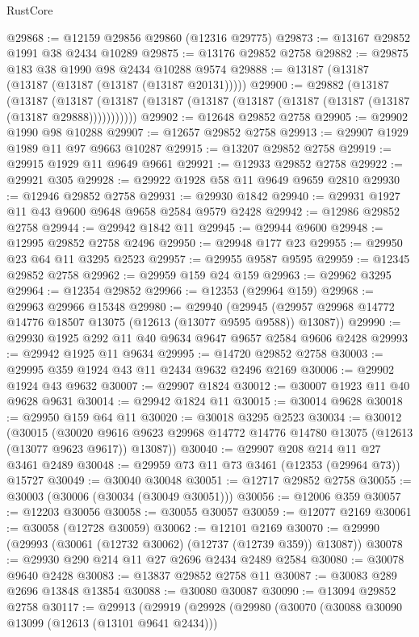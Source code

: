 \begin{lexlean}{RustCore}
\begin{coremodule}
@29868 := @12159 @29856 @29860 (@12316 @29775)
@29873 := @13167 @29852 @1991 @38 @2434 @10289
@29875 := @13176 @29852 @2758
@29882 := @29875 @183 @38 @1990 @98 @2434 @10288 @9574
@29888 := @13187 (@13187 (@13187 (@13187 (@13187 (@13187 @20131)))))
@29900 := @29882
    (@13187
      (@13187
        (@13187 (@13187 (@13187 (@13187 (@13187 (@13187 (@13187 (@13187 (@13187 @29888)))))))))))
@29902 := @12648 @29852 @2758
@29905 := @29902 @1990 @98 @10288
@29907 := @12657 @29852 @2758
@29913 := @29907 @1929 @1989 @11 @97 @9663 @10287
@29915 := @13207 @29852 @2758
@29919 := @29915 @1929 @11 @9649 @9661
@29921 := @12933 @29852 @2758
@29922 := @29921 @305
@29928 := @29922 @1928 @58 @11 @9649 @9659 @2810
@29930 := @12946 @29852 @2758
@29931 := @29930 @1842
@29940 := @29931 @1927 @11 @43 @9600 @9648 @9658 @2584 @9579 @2428
@29942 := @12986 @29852 @2758
@29944 := @29942 @1842 @11
@29945 := @29944 @9600
@29948 := @12995 @29852 @2758 @2496
@29950 := @29948 @177 @23
@29955 := @29950 @23 @64 @11 @3295 @2523
@29957 := @29955 @9587 @9595
@29959 := @12345 @29852 @2758
@29962 := @29959 @159 @24 @159
@29963 := @29962 @3295
@29964 := @12354 @29852
@29966 := @12353 (@29964 @159)
@29968 := @29963 @29966 @15348
@29980 := @29940
    (@29945 (@29957 @29968 @14772 @14776 @18507 @13075 (@12613 (@13077 @9595 @9588)) @13087))
@29990 := @29930 @1925 @292 @11 @40 @9634 @9647 @9657 @2584 @9606 @2428
@29993 := @29942 @1925 @11 @9634
@29995 := @14720 @29852 @2758
@30003 := @29995 @359 @1924 @43 @11 @2434 @9632 @2496 @2169
@30006 := @29902 @1924 @43 @9632
@30007 := @29907 @1824
@30012 := @30007 @1923 @11 @40 @9628 @9631
@30014 := @29942 @1824 @11
@30015 := @30014 @9628
@30018 := @29950 @159 @64 @11
@30020 := @30018 @3295 @2523
@30034 := @30012
    (@30015
      (@30020 @9616 @9623 @29968 @14772 @14776 @14780 @13075 (@12613 (@13077 @9623 @9617)) @13087))
@30040 := @29907 @208 @214 @11 @27 @3461 @2489
@30048 := @29959 @73 @11 @73 @3461 (@12353 (@29964 @73)) @15727
@30049 := @30040 @30048
@30051 := @12717 @29852 @2758
@30055 := @30003 (@30006 (@30034 (@30049 @30051)))
@30056 := @12006 @359
@30057 := @12203 @30056
@30058 := @30055 @30057
@30059 := @12077 @2169
@30061 := @30058 (@12728 @30059)
@30062 := @12101 @2169
@30070 := @29990 (@29993 (@30061 (@12732 @30062) (@12737 (@12739 @359)) @13087))
@30078 := @29930 @290 @214 @11 @27 @2696 @2434 @2489 @2584
@30080 := @30078 @9640 @2428
@30083 := @13837 @29852 @2758 @11
@30087 := @30083 @289 @2696 @13848 @13854
@30088 := @30080 @30087
@30090 := @13094 @29852 @2758
@30117 := @29913
    (@29919
      (@29928
        (@29980
          (@30070
            (@30088 @30090 @13099 (@12613 (@13101 @9641 @2434)))

\end{coremodule}
\end{lexlean}
